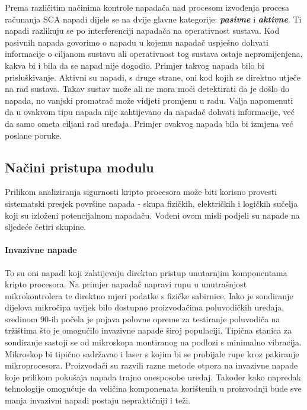 \documentclass[times, utf8, diplomski]{fer}
\begin{document}
Prema različitim načinima kontrole napadača nad procesom izvođenja procesa računanja SCA napadi dijele se na dvije glavne kategorije: \textit{\textbf{pasivne}} i \textit{\textbf{aktivne}}. Ti napadi razlikuju se po interferenciji napadača na operativnost sustava. Kod pasivnih napada govorimo o napadu u kojemu napadač uspješno dohvati informacije o ciljanom sustavu ali operativnost tog sustava ostaje nepromijenjena, kakva bi i bila da se napad nije dogodio. Primjer takvog napada bilo bi prisluškivanje. Aktivni su napadi, s druge strane, oni kod kojih se direktno utječe na rad sustava. Takav sustav može ali ne mora moći detektirati da je došlo do napada, no vanjski promatrač može vidjeti promjenu u radu. Valja napomenuti da u ovakvom tipu napada nije zahtijevano da napadač dohvati informacije, već da samo ometa ciljani rad uređaja. Primjer ovakvog napada bila bi izmjena već poslane poruke.

\subsection{Načini pristupa modulu}

Prilikom analiziranja sigurnosti kripto procesora može biti korisno provesti sistematski presjek površine napada - skupa fizičkih, električkih i logičkih sučelja koji su izloženi potencijalnom napadaču. Vođeni ovom misli \cite{anderson2006cryptographic} podjeli su napade na sljedeće četiri skupine.

\paragraph{Invazivne napade }
To su oni napadi koji zahtijevaju direktan pristup unutarnjim komponentama kripto procesora. Na primjer napadač napravi rupu u unutrašnjost mikrokontrolera te direktno mjeri podatke s fizičke sabirnice. Iako je sondiranje dijelova mikročipa uvijek bilo dostupno proizvođačima poluvodičkih uređaja, sredinom 90-ih počela je pojava polovne opreme za testiranje poluvodiča na tržištima što je omogućilo invazivne napade široj populaciji. Tipična stanica za sondiranje sastoji se od mikroskopa montiranog na podlozi s minimalno vibracija. Mikroskop bi tipično sadržavao i laser s kojim bi se probijale rupe kroz pakiranje mikroprocesora. Proizvođači su razvili razne metode otpora na invazivne napade koje prilikom pokušaja napada trajno onesposobe uređaj. Također kako napredak tehnologije omogućuje da veličina komponenata korištenih u proizvodnji bude sve manja invazivni napadi postaju nepraktičniji i teži.
\end{document}
